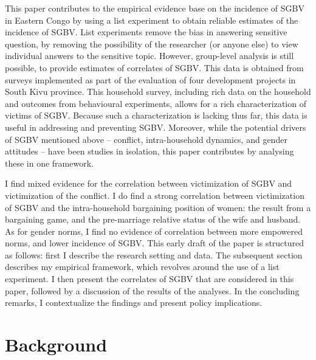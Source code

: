 \documentclass[10pt,a4paper]{scrartcl} %
\begin{document}
This paper contributes to the empirical evidence base on the incidence of SGBV in Eastern Congo by using a list experiment to obtain reliable estimates of the incidence of SGBV. List experiments remove the bias in answering sensitive question, by removing the possibility of the researcher (or anyone else) to view individual answers to the sensitive topic. However, group-level analysis is still possible, to provide estimates of correlates of SGBV. This data is obtained from surveys implemented as part of the evaluation of four development projects in South Kivu province. This household survey, including rich data on the household and outcomes from behavioural experiments, allows for a rich characterization of victims of SGBV.  Because such a characterization is lacking thus far, this data is useful in addressing and preventing SGBV. Moreover, while the potential drivers of SGBV mentioned above -- conflict, intra-household dynamics, and gender attitudes -- have been studies in isolation, this paper contributes by analysing these in one framework.

I find mixed evidence for the correlation between victimization of SGBV and victimization of the conflict. I do find a strong correlation between victimization of SGBV and the intra-household bargaining position of women: the result from a bargaining game, and the pre-marriage relative status of the wife and husband. As for gender norms, I find no evidence of correlation between more empowered norms, and lower incidence of SGBV. This early draft of the paper is structured as follows: first I describe the research setting and data. The subsequent section describes my empirical framework, which revolves around the use of a list experiment. I then present the correlates of SGBV that are considered in this paper, followed by a discussion of the results of the analyses. In the concluding remarks, I contextualize the findings and present policy implications.

\section*{Background}
\end{document}
